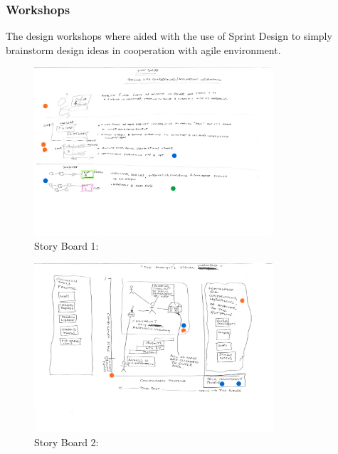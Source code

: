 \documentclass[journal]{vgtc}                %
\begin{document}
\subsubsection{Workshops}
The design workshops where aided with the use of Sprint Design to simply brainstorm design ideas in cooperation with agile environment.

\begin{figure}[htb]
 \centering
 \includegraphics[width=3.5in]{img/adrian}
 \caption{ Story Board 1: }
\end{figure}

\begin{figure}[htb]
 \centering
 \includegraphics[width=3.5in]{img/james}
 \caption{ Story Board 2: }
\end{figure}
\end{document}
